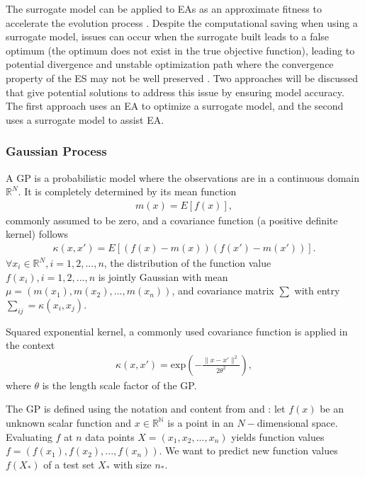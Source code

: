 The surrogate model can be applied to EAs as an approximate fitness to accelerate the evolution process \cite{Ratle:1998:ACE:645824.668750}. Despite the computational saving when using a surrogate model, issues can occur when the surrogate built leads to a false optimum (the optimum does not exist in the true objective function), leading to potential divergence and unstable optimization path where the convergence property of the ES may not be well preserved \cite{JIN201161}. Two approaches will be discussed that give potential solutions to address this issue by ensuring model accuracy. The first approach uses an EA to optimize a surrogate model, and the second uses a surrogate model to assist EA. 


\subsubsection{Gaussian Process}\label{sssec:GP}\hfill

A GP is a probabilistic model where the observations are in a continuous domain $\mathbb{R}^N$. It is completely determined by its mean function 
\begin{align}
m(x) = E [ f(x)],
\end{align}
commonly assumed to be zero, and a covariance function (a positive definite kernel) follows
\begin{align}
\kappa(x, x \prime) = E[(f(x)-m(x))(f(x \prime)-m(x \prime))].		
\end{align} 
$\forall x_i \in \mathbb{R}^N, i=1,2,...,n$, the distribution of the function value $f(x_i),i=1,2,...,n$ is jointly Gaussian with mean $\mu = (m(x_1),m(x_2),...,m(x_n))$, and covariance matrix $\sum$ with entry $\sum_{ij} = \kappa (x_i,x_j)$. 

Squared exponential kernel, a commonly used covariance function is applied in the context 
\begin{align}
\kappa(x, x \prime) = \text{exp} \left( - \frac{\|x - x \prime \|^2}{2 \theta^2} \right),
\end{align}
where $\theta$ is the length scale factor of the GP.

The GP is defined using the notation and content from \cite{rasmussen2004gaussian} and \cite{Murphy:2012:MLP:2380985}: let $f(x)$ be an unknown scalar function and $x \in \mathbb{R^N}$ is a point in an $N-$dimensional space. Evaluating $f$ at $n$ data points $X=(x_1,x_2,...,x_n)$ yields function values $f = (f(x_1),f(x_2),...,f(x_n))$. We want to predict new function values $f(X_*)$ of a test set $X_*$ with size $n_*$.

